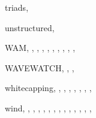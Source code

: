 \documentclass[12pt]{book}
\begin{document}
\begin{theindex}
  \item triads, 

  \indexspace

  \item unstructured, 

  \indexspace

  \item WAM, , , , 
		, , , 
		, , , 
  \item WAVEWATCH, , , 
  \item whitecapping, , , , 
		, , , 
		, 
  \item wind, , , , 
		, , , 
		, , , 
		, , , 
		, 

\end{theindex}
\end{document}
